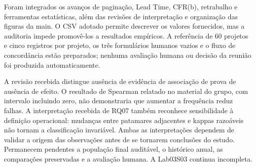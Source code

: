 \documentclass[12pt]{article}
\begin{document}
Foram integrados os avanços de paginação, Lead Time, CFR(b), retrabalho e ferramentas estatísticas, além das revisões de interpretação e organização das figuras da main. O CSV adotado permite descrever os valores fornecidos, mas a auditoria impede promovê-los a resultados empíricos. A referência de 60 projetos e cinco registros por projeto, os três formulários humanos vazios e o fluxo de concordância estão preparados; nenhuma avaliação humana ou decisão da reunião foi produzida automaticamente.

A revisão recebida distingue ausência de evidência de associação de prova de ausência de efeito. O resultado de Spearman relatado no material do grupo, com intervalo incluindo zero, não demonstraria que aumentar a frequência reduz falhas. A interpretação recebida de RQ07 também reconhece sensibilidade à definição operacional: mudanças entre patamares adjacentes e kappas razoáveis não tornam a classificação invariável. Ambas as interpretações dependem de validar a origem das observações antes de se tornarem conclusões do estudo. Permanecem pendentes a população final auditável, o histórico anual, as comparações preservadas e a avaliação humana. A Lab03S03 continua incompleta.



\end{document}
